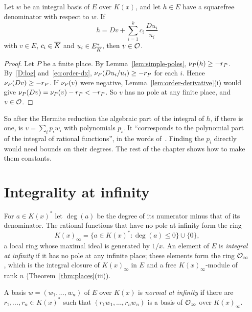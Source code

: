 \begin{proposition}\label{prop:v-integral}
Let $w$ be an integral basis of $E$ over $K(x)$, and let $h \in E$ have a
squarefree denominator with respect to $w$. If
\[
  h = Dv + \sum_{i=1}^k c_i\, \frac{Du_i}{u_i}
\]
with $v \in E$, $c_i \in \overline{K}$ and $u_i \in E_{\overline{K}}^*$, then $v \in \mathcal{O}$.
\end{proposition}

\begin{proof}
Let $P$ be a finite place. By Lemma~\ref{lem:simple-poles}, $\nu_{P}(h) \ge
-r_P$. By~\ref{D:log} and~\eqref{eq:order-dx}, $\nu_{P}(Du_i / u_i) \ge -r_P$
for each $i$. Hence $\nu_{P}(Dv) \ge -r_P$. If $\nu_{P}(v)$ were negative,
Lemma~\ref{lem:order-derivative}(i) would give $\nu_{P}(Dv) = \nu_{P}(v) - r_P
< -r_P$. So $v$ has no pole at any finite place, and $v \in \mathcal{O}$.
\end{proof}

So after the Hermite reduction the algebraic part of the integral of $h$, if
there is one, is $v = \sum_i p_i w_i$ with polynomials $p_i$. It ``corresponds
to the polynomial part of the integral of rational functions'', in the words
of~\cite[\S2.4]{bronstein1998tutorial}. Finding the $p_i$ directly would need
bounds on their degrees. The rest of the chapter shows how to make them
constants.

\section{Integrality at infinity}\label{sec:algpart-infinity}

For $a \in K(x)^*$ let $\deg(a)$ be the degree of its numerator minus that of
its denominator. The rational functions that have no pole at infinity form
the ring
\[
  K(x)_\infty = \{ a \in K(x)^* : \deg(a) \le 0 \} \cup \{0\} ,
\]
a local ring whose maximal ideal is generated by $1/x$. An element of $E$ is
\emph{integral at infinity} if it has no pole at any infinite place; these
elements form the ring $\mathcal{O}_\infty$, which is the integral closure of
$K(x)_\infty$ in $E$ and a free $K(x)_\infty$-module of rank $n$
(Theorem~\ref{thm:places}(iii)).

\begin{definition}\label{def:normal-infinity}
A basis $w = (w_1, \dots, w_n)$ of $E$ over $K(x)$ is \emph{normal at
infinity} if there are $r_1, \dots, r_n \in K(x)^*$ such that $(r_1 w_1,
\dots, r_n w_n)$ is a basis of $\mathcal{O}_\infty$ over $K(x)_\infty$.
\end{definition}

